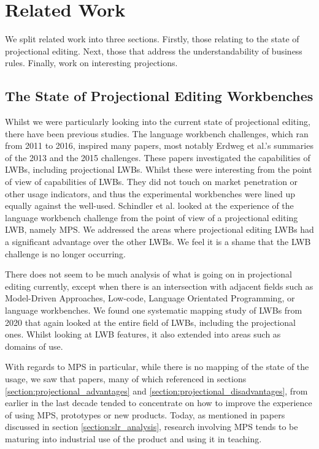 \chapter{Related Work}
\label{chapter:RelatedWork}

We split related work into three sections. 
Firstly, those relating to the state of projectional editing.
Next, those that address the understandability of business rules.
Finally, work on interesting projections.

\section{The State of Projectional Editing Workbenches}

Whilst we were particularly looking into the current state of projectional editing, there have been previous studies.
The language workbench challenges, which ran from 2011 to 2016, inspired many papers, most notably Erdweg et al.'s summaries of the 2013\cite{erdweg2013state} and the 2015\cite{erdweg2015evaluating} challenges.
These papers investigated the capabilities of LWBs, including projectional LWBs.
Whilst these were interesting from the point of view of capabilities of LWBs. 
They did not touch on market penetration or other usage indicators, and thus the experimental workbenches were lined up equally against the well-used.
Schindler et al.\cite{schindler2016language} looked at the experience of the language workbench challenge from the point of view of a projectional editing LWB, namely MPS.
We addressed the areas where projectional editing LWBs had a significant advantage over the other LWBs. 
We feel it is a shame that the LWB challenge is no longer occurring.

There does not seem to be much analysis of what is going on in projectional editing currently, except when there is an intersection with adjacent fields such as Model-Driven Approaches, Low-code, Language Orientated Programming, or language workbenches.
We found one systematic mapping study of LWBs\cite{iung2020systematic} from 2020 that again looked at the entire field of LWBs, including the projectional ones.
Whilst looking at LWB features, it also extended into areas such as domains of use.

With regards to MPS in particular, while there is no mapping of the state of the usage, we saw that papers, many of which referenced in sections \ref{section:projectional_advantages} and \ref{section:projectional_disadvantages}, from earlier in the last decade tended to concentrate on how to improve the experience of using MPS, prototypes or new products.
Today, as mentioned in papers discussed in section \ref{section:slr_analysis}, research involving MPS tends to be maturing into industrial use of the product and using it in teaching.

